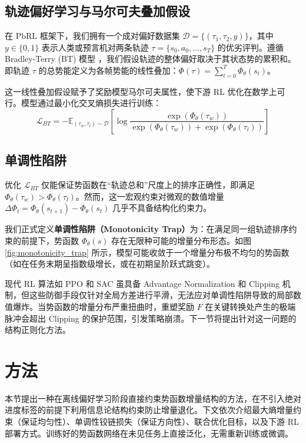 \subsection{轨迹偏好学习与马尔可夫叠加假设}

在 PbRL 框架下，我们拥有一个成对偏好数据集 $\mathcal{D} = \{(\tau_1, \tau_2, y)\}$，其中 $y \in \{0, 1\}$ 表示人类或预言机对两条轨迹 $\tau = \{s_0, a_0, \dots, s_T\}$ 的优劣评判。遵循 Bradley-Terry (BT) 模型 \cite{bradley1952, christiano2017deep}，我们假设轨迹的整体偏好取决于其状态势的累积和。即轨迹 $\tau$ 的总势能定义为各帧势能的线性叠加：$\Phi(\tau) = \sum_{t=0}^T \Phi_\theta(s_t)$。

这一线性叠加假设赋予了奖励模型马尔可夫属性，使下游 RL 优化在数学上可行。模型通过最小化交叉熵损失进行训练：
\begin{equation}
\label{eq:bt}
    \mathcal{L}_{BT} = - \mathbb{E}_{(\tau_w, \tau_l) \sim \mathcal{D}} \left[ \log \frac{\exp(\Phi_\theta(\tau_w))}{\exp(\Phi_\theta(\tau_w)) + \exp(\Phi_\theta(\tau_l))} \right]
\end{equation}

\subsection{单调性陷阱}

优化 $\mathcal{L}_{BT}$ 仅能保证势函数在“轨迹总和”尺度上的排序正确性，即满足 $\Phi_\theta(\tau_w) > \Phi_\theta(\tau_l)$。然而，这一宏观约束对微观的数值增量 $\Delta \Phi_t = \Phi_\theta(s_{t+1}) - \Phi_\theta(s_t)$ 几乎不具备结构化约束力。

我们正式定义\textbf{单调性陷阱（Monotonicity Trap）}为：在满足同一组轨迹排序约束的前提下，势函数 $\Phi_\theta(s)$ 存在无限种可能的增量分布形态。如图 \ref{fig:monotonicity_trap} 所示，模型可能收敛于一个增量分布极不均匀的势函数（如在任务末期呈指数级增长，或在初期呈阶跃式跳变）。

现代 RL 算法如 PPO \cite{schulman2017} 和 SAC \cite{haarnoja2018} 虽具备 Advantage Normalization 和 Clipping 机制，但这些防御手段仅针对全局方差进行平滑，无法应对单调性陷阱导致的局部数值爆炸。当势函数的增量分布严重扭曲时，重塑奖励 $F$ 在关键转换处产生的极端脉冲会超出 Clipping 的保护范围，引发策略崩溃。下一节将提出针对这一问题的结构正则化方法。

\section{方法}

本节提出一种在离线偏好学习阶段直接约束势函数增量结构的方法，在不引入绝对进度标签的前提下利用信息论结构约束防止增量退化。下文依次介绍最大熵增量约束（保证均匀性）、单调性铰链损失（保证方向性）、联合优化目标，以及下游 RL 部署方式。训练好的势函数网络在未见任务上直接泛化，无需重新训练或微调。

